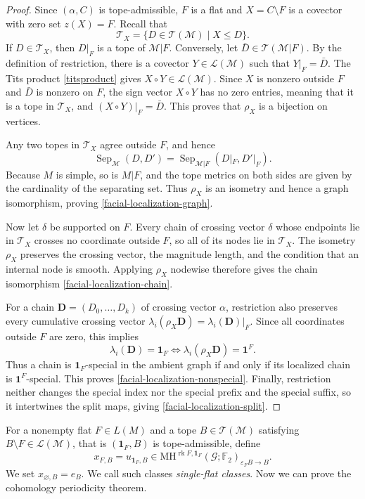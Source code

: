 \documentclass[10pt]{amsart}
\theoremstyle{plain}
\theoremstyle{definition}
\newcommand{\one}{\mathbf{1}}
\newcommand{\T}{\mathcal{T}}
\newcommand{\G}{\mathcal{G}}
\newcommand{\MH}{\mathrm{MH}}
\newcommand{\M}{\mathcal{M}}
\newcommand{\Lcov}{\mathcal{L}}
\newcommand{\Sep}{\operatorname{Sep}}
\newcommand{\rk}{\operatorname{rk}}
\newcommand{\eps}{\varepsilon}
\newcommand{\Ftwo}{\mathbb F_2}
\newcommand{\bD}{\boldsymbol{D}}
\begin{document}
\begin{proof}
Since $(\alpha,C)$ is tope-admissible, $F$ is a flat and $X=C\setminus F$ is a covector with zero set $z(X)=F$. Recall that
\[
\T_X=\{D\in\T(\M)\mid X\leq D\}.
\]
If $D\in\T_X$, then $D|_F$ is a tope of $\M|F$. Conversely, let $\bar D\in\T(\M|F)$. By the definition of restriction, there is a covector $Y\in\Lcov(\M)$ such that $Y|_F=\bar D$. The Tits product \eqref{titsproduct} gives $X\circ Y\in\Lcov(\M)$. Since $X$ is nonzero outside $F$ and $\bar D$ is nonzero on $F$, the sign vector $X\circ Y$ has no zero entries, meaning that it is a tope in $\T_X$, and $(X\circ Y)|_F=\bar D$. This proves that $\rho_X$ is a bijection on vertices.

Any two topes in $\T_X$ agree outside $F$, and hence
\[
 \Sep_{\M}(D,D')=\Sep_{\M|F}(D|_F,D'|_F).
\]
Because $M$ is simple, so is $M|F$, and the tope metrics on both sides are given by the cardinality of the separating set. Thus $\rho_X$ is an isometry and hence a graph isomorphism, proving \eqref{facial-localization-graph}.

Now let $\delta$ be supported on $F$. Every chain of crossing vector $\delta$ whose endpoints lie in $\T_X$ crosses no coordinate outside $F$, so all of its nodes lie in $\T_X$. The isometry $\rho_X$ preserves the crossing vector, the magnitude length, and the condition that an internal node is smooth. Applying $\rho_X$ nodewise therefore gives the chain isomorphism \eqref{facial-localization-chain}.

For a chain $\bD=(D_0,\ldots,D_k)$ of crossing vector $\alpha$, restriction also preserves every cumulative crossing vector $\lambda_i(\rho_X\bD)=\lambda_i(\bD)|_F$. Since all coordinates outside $F$ are zero, this implies
\[
\lambda_i(\bD)=\one_F \iff \lambda_i(\rho_X\bD)=\one^F.
\]
Thus a chain is $\one_F$-special in the ambient graph if and only if its localized chain is $\one^F$-special. This proves \eqref{facial-localization-nonspecial}. Finally, restriction neither changes the special index nor the special prefix and the special suffix, so it intertwines the split maps, giving \eqref{facial-localization-split}.
\end{proof}

For a nonempty flat $F\in L(M)$ and a tope $B\in\T(\M)$ satisfying $B\setminus F\in\Lcov(\M)$, that is $(\one_F,B)$ is tope-admissible, define
\begin{equation}\label{single-flat}
x_{F,B}=u_{\one_F,B}\in\MH^{\rk F,\one_F}(\G;\Ftwo)_{\eps_FB\to B}.    
\end{equation}
We set $x_{\varnothing,B}=e_B$. We call such classes \emph{single-flat classes}. Now we can prove the cohomology periodicity theorem.
\end{document}
